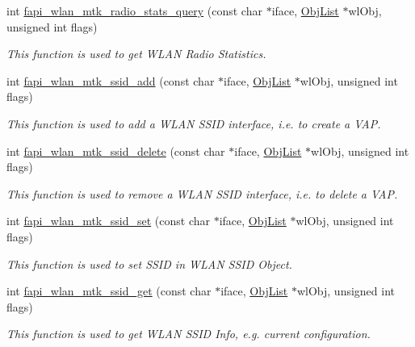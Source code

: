 \begin{DoxyCompactItemize}
int \hyperlink{group__FAPI__WLAN__MTK_gaa345bef0cb71602644034ff5c749b9c2}{fapi\-\_\-wlan\-\_\-mtk\-\_\-radio\-\_\-stats\-\_\-query} (const char $\ast$iface, \hyperlink{structObjList}{Obj\-List} $\ast$wl\-Obj, unsigned int flags)
\begin{DoxyCompactList}\small\item\em This function is used to get W\-L\-A\-N Radio Statistics. \end{DoxyCompactList}\item 
int \hyperlink{group__FAPI__WLAN__MTK_ga4786caff1c55d1d5b100ce774c00c1a2}{fapi\-\_\-wlan\-\_\-mtk\-\_\-ssid\-\_\-add} (const char $\ast$iface, \hyperlink{structObjList}{Obj\-List} $\ast$wl\-Obj, unsigned int flags)
\begin{DoxyCompactList}\small\item\em This function is used to add a W\-L\-A\-N S\-S\-I\-D interface, i.\-e. to create a V\-A\-P. \end{DoxyCompactList}\item 
int \hyperlink{group__FAPI__WLAN__MTK_gae7220c3b8286cca502ea1b49cee1be89}{fapi\-\_\-wlan\-\_\-mtk\-\_\-ssid\-\_\-delete} (const char $\ast$iface, \hyperlink{structObjList}{Obj\-List} $\ast$wl\-Obj, unsigned int flags)
\begin{DoxyCompactList}\small\item\em This function is used to remove a W\-L\-A\-N S\-S\-I\-D interface, i.\-e. to delete a V\-A\-P. \end{DoxyCompactList}\item 
int \hyperlink{group__FAPI__WLAN__MTK_ga71e67cab797b2c5a7c5e9d086fe17d60}{fapi\-\_\-wlan\-\_\-mtk\-\_\-ssid\-\_\-set} (const char $\ast$iface, \hyperlink{structObjList}{Obj\-List} $\ast$wl\-Obj, unsigned int flags)
\begin{DoxyCompactList}\small\item\em This function is used to set S\-S\-I\-D in W\-L\-A\-N S\-S\-I\-D Object. \end{DoxyCompactList}\item 
int \hyperlink{group__FAPI__WLAN__MTK_ga363651e024fe759b03f0e4a5ac303061}{fapi\-\_\-wlan\-\_\-mtk\-\_\-ssid\-\_\-get} (const char $\ast$iface, \hyperlink{structObjList}{Obj\-List} $\ast$wl\-Obj, unsigned int flags)
\begin{DoxyCompactList}\small\item\em This function is used to get W\-L\-A\-N S\-S\-I\-D Info, e.\-g. current configuration. \end{DoxyCompactList}\item 

\end{DoxyCompactItemize}
